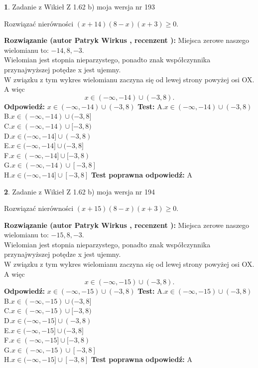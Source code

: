 \documentclass[12pt, a4paper]{article}
\theoremstyle{definition} %
\newtheorem{zad}{}
\newcommand{\zadStart}[1]{\begin{zad}#1\newline}
\newcommand{\zadStop}{\end{zad}}
\newcommand{\rozwStart}[2]{\noindent \textbf{Rozwiązanie (autor #1 , recenzent #2): }\newline}
\newcommand{\rozwStop}{\newline}
\newcommand{\odpStart}{\noindent \textbf{Odpowiedź:}\newline}
\newcommand{\odpStop}{\newline}
\newcommand{\testStart}{\noindent \textbf{Test:}\newline}
\newcommand{\testStop}{\newline}
\newcommand{\kluczStart}{\noindent \textbf{Test poprawna odpowiedź:}\newline}
\newcommand{\kluczStop}{\newline}
\begin{document}
\zadStart{Zadanie z Wikieł Z 1.62 b) moja wersja nr 193}

Rozwiązać nierówności $(x+14)(8-x)(x+3)\ge0$.
\zadStop
\rozwStart{Patryk Wirkus}{}
Miejsca zerowe naszego wielomianu to: $-14, 8, -3$.\\
Wielomian jest stopnia nieparzystego, ponadto znak współczynnika przy\linebreak najwyższej potędze x jest ujemny.\\ W związku z tym wykres wielomianu zaczyna się od lewej strony powyżej osi OX. A więc $$x \in (-\infty,-14) \cup (-3,8).$$
\rozwStop
\odpStart
$x \in (-\infty,-14) \cup (-3,8)$
\odpStop
\testStart
A.$x \in (-\infty,-14) \cup (-3,8)$\\
B.$x \in (-\infty,-14) \cup (-3,8]$\\
C.$x \in (-\infty,-14) \cup [-3,8)$\\
D.$x \in (-\infty,-14] \cup (-3,8)$\\
E.$x \in (-\infty,-14] \cup (-3,8]$\\
F.$x \in (-\infty,-14] \cup [-3,8)$\\
G.$x \in (-\infty,-14) \cup [-3,8]$\\
H.$x \in (-\infty,-14] \cup [-3,8]$
\testStop
\kluczStart
A
\kluczStop



\zadStart{Zadanie z Wikieł Z 1.62 b) moja wersja nr 194}

Rozwiązać nierówności $(x+15)(8-x)(x+3)\ge0$.
\zadStop
\rozwStart{Patryk Wirkus}{}
Miejsca zerowe naszego wielomianu to: $-15, 8, -3$.\\
Wielomian jest stopnia nieparzystego, ponadto znak współczynnika przy\linebreak najwyższej potędze x jest ujemny.\\ W związku z tym wykres wielomianu zaczyna się od lewej strony powyżej osi OX. A więc $$x \in (-\infty,-15) \cup (-3,8).$$
\rozwStop
\odpStart
$x \in (-\infty,-15) \cup (-3,8)$
\odpStop
\testStart
A.$x \in (-\infty,-15) \cup (-3,8)$\\
B.$x \in (-\infty,-15) \cup (-3,8]$\\
C.$x \in (-\infty,-15) \cup [-3,8)$\\
D.$x \in (-\infty,-15] \cup (-3,8)$\\
E.$x \in (-\infty,-15] \cup (-3,8]$\\
F.$x \in (-\infty,-15] \cup [-3,8)$\\
G.$x \in (-\infty,-15) \cup [-3,8]$\\
H.$x \in (-\infty,-15] \cup [-3,8]$
\testStop
\kluczStart
A
\kluczStop
\end{document}
